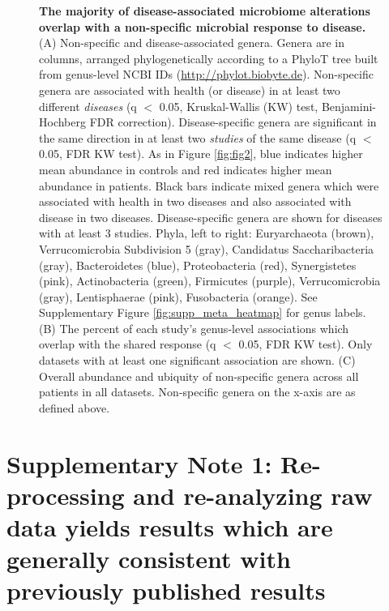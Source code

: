 {\newpage
\begin{figure}[h]
	\begin{center}
	\caption{\textbf{The majority of disease-associated microbiome alterations overlap with a non-specific microbial response to disease.} (A) Non-specific and disease-associated genera. Genera are in columns, arranged phylogenetically according to a PhyloT tree built from genus-level NCBI IDs (\url{http://phylot.biobyte.de}). Non-specific genera are associated with health (or disease) in at least two different \textit{diseases} (q $<$ 0.05, Kruskal-Wallis (KW) test, Benjamini-Hochberg FDR correction). Disease-specific genera are significant in the same direction in at least two \textit{studies} of the same disease (q $<$ 0.05, FDR KW test). As in Figure \ref{fig:fig2}, blue indicates higher mean abundance in controls and red indicates higher mean abundance in patients. Black bars indicate mixed genera which were associated with health in two diseases and also associated with disease in two diseases. Disease-specific genera are shown for diseases with at least 3 studies. Phyla, left to right: Euryarchaeota (brown), Verrucomicrobia Subdivision 5 (gray), Candidatus Saccharibacteria (gray), Bacteroidetes (blue), Proteobacteria (red), Synergistetes (pink), Actinobacteria (green), Firmicutes (purple), Verrucomicrobia (gray), Lentisphaerae (pink), Fusobacteria (orange). See Supplementary Figure \ref{fig:supp_meta_heatmap} for genus labels. (B) The percent of each study's genus-level associations which overlap with the shared response  (q $<$ 0.05, FDR KW test). Only datasets with at least one significant association are shown. (C) Overall abundance and ubiquity of non-specific genera across all patients in all datasets. Non-specific genera on the x-axis are as defined above.}
	\label{fig:fig3}
	\end{center}
\end{figure}

\FloatBarrier

\renewcommand{\figurename}{Supplementary Figure}
\renewcommand{\tablename}{Supplementary Table}
\setcounter{figure}{0}
\setcounter{table}{0}

\section*{Supplementary Note 1: Re-processing and re-analyzing raw data yields results which are generally consistent with previously published results}\label{sec:lit_comp}

}
